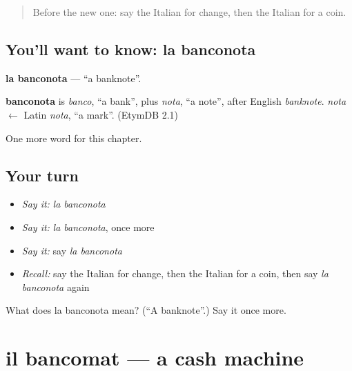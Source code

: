 \label{lesson:IT-C226-banconota}



\begin{quote}
Before the new one: say the Italian for change, then the Italian for a coin.
\end{quote}

\subsection*{You'll want to know: la banconota}
\textbf{la banconota} — \textquotedblleft{}a banknote\textquotedblright{}.

\begin{cousinweb}
\textbf{banconota} is \emph{banco}, \textquotedblleft{}a bank\textquotedblright{}, plus \emph{nota}, \textquotedblleft{}a note\textquotedblright{}, after English \emph{banknote}. \emph{nota} $\leftarrow$ Latin \emph{nota}, \textquotedblleft{}a mark\textquotedblright{}. (EtymDB 2.1)
\end{cousinweb}

\begin{grammarlens}[title={What you've built}]
One more word for this chapter.
\end{grammarlens}

\subsection*{Your turn}
\begin{itemize}
\raggedright
  \item \emph{Say it:} \emph{la banconota}
  \item \emph{Say it:} \emph{la banconota}, once more
  \item \emph{Say it:} say \emph{la banconota}
  \item \emph{Recall:} say the Italian for change, then the Italian for a coin, then say \emph{la banconota} again
\end{itemize}

\begin{tcolorbox}[breakable,colback=teal!4,colframe=teal!35!black,title={Before you move on}]
What does la banconota mean? (\textquotedblleft{}A banknote\textquotedblright{}.) Say it once more.
\end{tcolorbox}
\section[il bancomat]{il bancomat — a cash machine}

